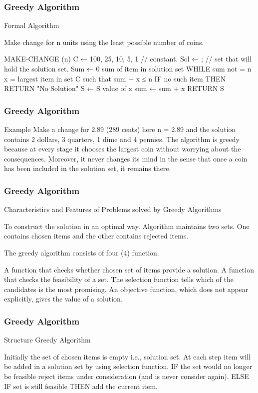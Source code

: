 \begin{frame}
\frametitle{Greedy Algorithm}

Formal Algorithm

Make change for n units using the least possible number of coins.

MAKE-CHANGE (n)
        C ← {100, 25, 10, 5, 1}     // constant.
        Sol ← {};                         // set that will hold the solution set.
        Sum ← 0 sum of item in solution set
        WHILE sum not = n
            x = largest item in set C such that sum + x ≤ n
            IF no such item THEN
                RETURN    "No Solution"
            S ← S {value of x}
            sum ← sum + x
        RETURN S


\end{frame}
\begin{frame}
\frametitle{Greedy Algorithm} 

Example     Make a change for 2.89 (289 cents) here n = 2.89 and the solution contains 2 dollars, 3 quarters, 1 dime and 4 pennies. The algorithm is greedy because at every stage it chooses the largest coin without worrying about the consequences. Moreover, it never changes its mind in the sense that once a coin has been included in the solution set, it remains there.


\end{frame}
\begin{frame}
\frametitle{Greedy Algorithm} 

Characteristics and Features of Problems solved by Greedy Algorithms


To construct the solution in an optimal way. Algorithm maintains two sets. One contains chosen items and the other contains rejected items.

The greedy algorithm consists of four (4) function.

A function that checks whether chosen set of items provide a solution.
A function that checks the feasibility of a set.
The selection function tells which of the candidates is the most promising.
An objective function, which does not appear explicitly, gives the value of a solution.
 
\end{frame}
\begin{frame}
\frametitle{Greedy Algorithm}

Structure Greedy Algorithm

Initially the set of chosen items is empty i.e., solution set.
At each step
item will be added in a solution set by using selection function.
IF the set would no longer be feasible
reject items under consideration (and is never consider again).
ELSE IF set is still feasible THEN
add the current item.
 
\end{frame}
